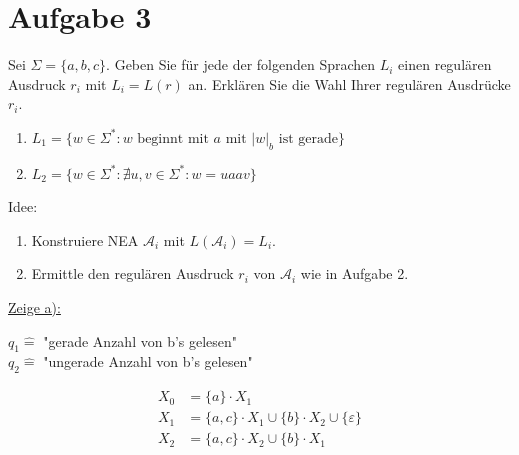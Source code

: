 \documentclass[12pt,a4paper]{article}
\newcommand{\A}{\mathcal{A}}
\begin{document}
\section*{Aufgabe 3}
Sei $\Sigma=\lbrace a,b,c\rbrace$. Geben Sie für jede der folgenden Sprachen $L_i$ einen regulären Ausdruck $r_i$ mit $L_i=L(r)$ an.
Erklären Sie die Wahl Ihrer regulären Ausdrücke $r_i$.

\begin{enumerate}[label=\alph*)]
	\item $L_1=\big\lbrace w\in\Sigma^\ast:w\text{ beginnt mit $a$ mit $|w|_b$ ist gerade}\big\rbrace$
	\item $L_2=\big\lbrace w\in\Sigma^\ast:\nexists u,v\in\Sigma^\ast:w=uaav\big\rbrace$
\end{enumerate}

\begin{lösung}
	Idee: 
	\begin{enumerate}
		\item Konstruiere NEA $\A_i$ mit $L(\A_i)=L_i$.
		\item Ermittle den regulären Ausdruck $r_i$ von $\A_i$ wie in Aufgabe 2.
	\end{enumerate}		

	\underline{Zeige a):}
	
	\usetikzlibrary{positioning,automata}

	$q_1\hat{=}$ "gerade Anzahl von b's gelesen"\\
	$q_2\hat{=}$ "ungerade Anzahl von b's gelesen"
	
	\begin{align}
		X_0&=\lbrace a\rbrace\cdot X_1\\
		X_1&=\lbrace a,c\rbrace\cdot X_1\cup\lbrace b\rbrace\cdot X_2\cup\lbrace\varepsilon\rbrace\\
		X_2&=\lbrace a,c\rbrace\cdot X_2\cup\lbrace b\rbrace\cdot X_1
	\end{align}
	

\end{lösung}
\end{document}

